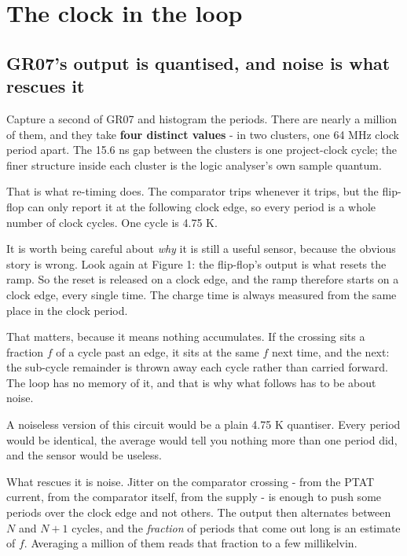 \section{The clock in the loop}\label{the-clock-in-the-loop}

\subsection{GR07's output is quantised, and noise is what rescues
it}\label{gr07s-output-is-quantised-and-noise-is-what-rescues-it}

Capture a second of GR07 and histogram the periods. There are nearly a
million of them, and they take \textbf{four distinct values} - in two
clusters, one 64 MHz clock period apart. The 15.6 ns gap between the
clusters is one project-clock cycle; the finer structure inside each
cluster is the logic analyser's own sample quantum.

That is what re-timing does. The comparator trips whenever it trips, but
the flip-flop can only report it at the following clock edge, so every
period is a whole number of clock cycles. One cycle is 4.75 K.

It is worth being careful about \emph{why} it is still a useful sensor,
because the obvious story is wrong. Look again at Figure 1: the
flip-flop's output is what resets the ramp. So the reset is released on
a clock edge, and the ramp therefore starts on a clock edge, every
single time. The charge time is always measured from the same place in
the clock period.

That matters, because it means nothing accumulates. If the crossing sits
a fraction \(f\) of a cycle past an edge, it sits at the same \(f\) next
time, and the next: the sub-cycle remainder is thrown away each cycle
rather than carried forward. The loop has no memory of it, and that is
why what follows has to be about noise.

A noiseless version of this circuit would be a plain 4.75 K quantiser.
Every period would be identical, the average would tell you nothing more
than one period did, and the sensor would be useless.

What rescues it is noise. Jitter on the comparator crossing - from the
PTAT current, from the comparator itself, from the supply - is enough to
push some periods over the clock edge and not others. The output then
alternates between \(N\) and \(N+1\) cycles, and the \emph{fraction} of
periods that come out long is an estimate of \(f\). Averaging a million
of them reads that fraction to a few millikelvin.

